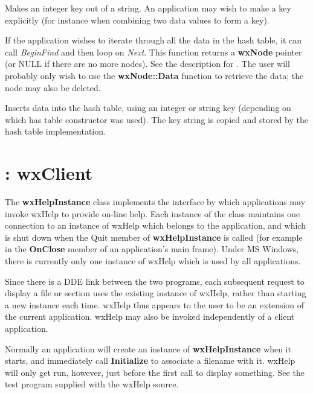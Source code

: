 Makes an integer key out of a string. An application may wish to make a key
explicitly (for instance when combining two data values to form a key).



If the application wishes to iterate through all the data in the hash
table, it can call {\it BeginFind} and then loop on {\it Next}. This function
returns a {\bf wxNode} pointer (or NULL if there are no more nodes).  See the
description for . The user will probably only wish to use the
{\bf wxNode::Data} function to retrieve the data; the node may also be deleted.




Inserts data into the hash table, using an integer or string key (depending on which
has table constructor was used). The key string is copied and stored by the hash
table implementation.

\section{: wxClient}\label{wxhelpinstance}

The {\bf wxHelpInstance} class implements the interface by which
applications may invoke wxHelp to provide on-line help. Each instance
of the class maintains one connection to an instance of wxHelp which
belongs to the application, and which is shut down when the Quit
member of {\bf wxHelpInstance} is called (for example in the {\bf
OnClose} member of an application's main frame). Under MS Windows,
there is currently only one instance of wxHelp which is used by all
applications.

Since there is a DDE link between the two programs, each subsequent
request to display a file or section uses the existing instance of
wxHelp, rather than starting a new instance each time. wxHelp thus
appears to the user to be an extension of the current application.
wxHelp may also be invoked independently of a client application.

Normally an application will create an instance of {\bf
wxHelpInstance} when it starts, and immediately call {\bf Initialize}\rtfsp
to associate a filename with it. wxHelp will only get run, however,
just before the first call to display something. See the test program
supplied with the wxHelp source.

